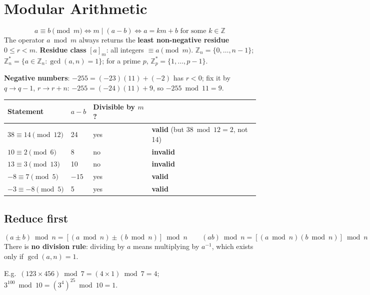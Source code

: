 \section{Modular Arithmetic}\label{sec:modular}

\begin{keybox}[title=Definitions]
\vspace{-6pt}
\[
a \equiv b \pmod m \iff m \mid (a - b) \iff a = km + b \text{ for some } k \in \mathbb{Z}
\]
The operator $a \bmod m$ always returns the \textbf{least non-negative residue} $0 \le r < m$. \textbf{Residue class} $[a]_m$: all integers $\equiv a \pmod m$. $\mathbb{Z}_n = \{0, \dots, n-1\}$; $\mathbb{Z}_n^* = \{a \in \mathbb{Z}_n : \gcd(a,n) = 1\}$; for a prime $p$, $\mathbb{Z}_p^* = \{1, \dots, p-1\}$.
\end{keybox}

\textbf{Negative numbers}: $-255 = (-23)(11) + (-2)$ has $r < 0$; fix it by $q \to q - 1$, $r \to r + n$: $-255 = (-24)(11) + 9$, so $-255 \bmod 11 = 9$.

\begin{center}\small
\begin{tabular}{@{}llll@{}}
\toprule
Statement & $a - b$ & Divisible by $m$? & \\
\midrule
$38 \equiv 14 \pmod{12}$ & 24 & yes & \textbf{valid} (but $38 \bmod 12 = 2$, not 14)\\
$10 \equiv 2 \pmod 6$ & 8 & no & \textbf{invalid}\\
$13 \equiv 3 \pmod{13}$ & 10 & no & \textbf{invalid}\\
$-8 \equiv 7 \pmod 5$ & $-15$ & yes & \textbf{valid}\\
$-3 \equiv -8 \pmod 5$ & 5 & yes & \textbf{valid}\\
\bottomrule
\end{tabular}
\end{center}

\subsection{Reduce first}
\begin{keybox}
\vspace{-6pt}
\[
(a \pm b) \bmod n = [(a \bmod n) \pm (b \bmod n)] \bmod n \qquad (a b) \bmod n = [(a \bmod n)(b \bmod n)] \bmod n
\]
There is \textbf{no division rule}: dividing by $a$ means multiplying by $a^{-1}$, which exists only if $\gcd(a, n) = 1$.
\end{keybox}
E.g.\ $(123 \times 456) \bmod 7 = (4 \times 1) \bmod 7 = 4$; \; $3^{100} \bmod 10 = (3^4)^{25} \bmod 10 = 1$.

